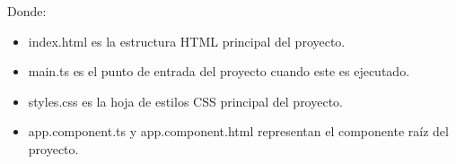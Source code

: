 Donde:
\begin{itemize}
    \item index.html es la estructura HTML principal del proyecto.
    \item main.ts es el punto de entrada del proyecto cuando este es ejecutado.
    \item styles.css es la hoja de estilos CSS principal del proyecto.
    \item app.component.ts y app.component.html representan el componente raíz del proyecto.
\end{itemize}
